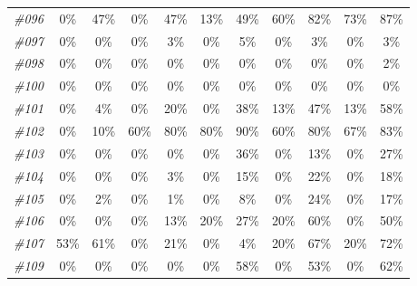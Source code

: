 \begin{table}[t]
\begin{tabular}{ccccccccccc}
      \textit{\#096} & 0\% & 47\% & 0\% & 47\% & 13\% & 49\% & 60\% & 82\% & 73\% & 87\% \\
      \textit{\#097} & 0\% & 0\% & 0\% & 3\% & 0\% & 5\% & 0\% & 3\% & 0\% & 3\% \\
      \textit{\#098} & 0\% & 0\% & 0\% & 0\% & 0\% & 0\% & 0\% & 0\% & 0\% & 2\% \\
      \textit{\#100} & 0\% & 0\% & 0\% & 0\% & 0\% & 0\% & 0\% & 0\% & 0\% & 0\% \\
      \textit{\#101} & 0\% & 4\% & 0\% & 20\% & 0\% & 38\% & 13\% & 47\% & 13\% & 58\% \\
      \textit{\#102} & 0\% & 10\% & 60\% & 80\% & 80\% & 90\% & 60\% & 80\% & 67\% & 83\% \\
      \textit{\#103} & 0\% & 0\% & 0\% & 0\% & 0\% & 36\% & 0\% & 13\% & 0\% & 27\% \\
      \textit{\#104} & 0\% & 0\% & 0\% & 3\% & 0\% & 15\% & 0\% & 22\% & 0\% & 18\% \\
      \textit{\#105} & 0\% & 2\% & 0\% & 1\% & 0\% & 8\% & 0\% & 24\% & 0\% & 17\% \\
      \textit{\#106} & 0\% & 0\% & 0\% & 13\% & 20\% & 27\% & 20\% & 60\% & 0\% & 50\% \\
      \textit{\#107} & 53\% & 61\% & 0\% & 21\% & 0\% & 4\% & 20\% & 67\% & 20\% & 72\% \\
      \textit{\#109} & 0\% & 0\% & 0\% & 0\% & 0\% & 58\% & 0\% & 53\% & 0\% & 62\% \\
    \bottomrule
    \end{tabular}%
  \label{tab:exp_LejuKUAVO_2}%
\end{table}%


